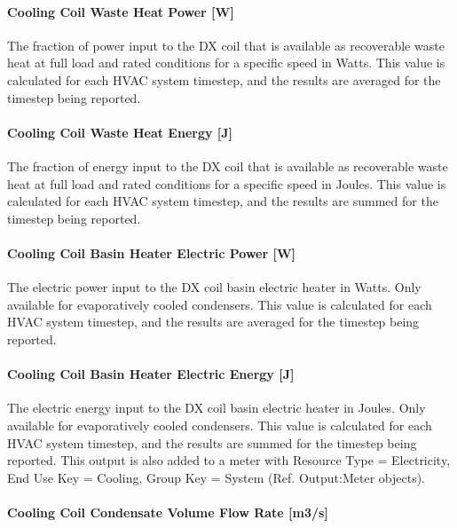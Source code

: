 \paragraph{Cooling Coil Waste Heat Power {[}W{]}}

The fraction of power input to the DX coil that is available as recoverable waste heat at full load and rated conditions for a specific speed in Watts. This value is calculated for each HVAC system timestep, and the results are averaged for the timestep being reported.

\paragraph{Cooling Coil Waste Heat Energy {[}J{]}}

The fraction of energy input to the DX coil that is available as recoverable waste heat at full load and rated conditions for a specific speed in Joules. This value is calculated for each HVAC system timestep, and the results are summed for the timestep being reported.

\paragraph{Cooling Coil Basin Heater Electric Power {[}W{]}}

The electric power input to the DX coil basin electric heater in Watts. Only available for evaporatively cooled condensers. This value is calculated for each HVAC system timestep, and the results are averaged for the timestep being reported.

\paragraph{Cooling Coil Basin Heater Electric Energy {[}J{]}}

The electric energy input to the DX coil basin electric heater in Joules. Only available for evaporatively cooled condensers. This value is calculated for each HVAC system timestep, and the results are summed for the timestep being reported. This output is also added to a meter with Resource Type = Electricity, End Use Key = Cooling, Group Key = System (Ref. Output:Meter objects).

\paragraph{Cooling Coil Condensate Volume Flow Rate {[}m3/s{]}}

